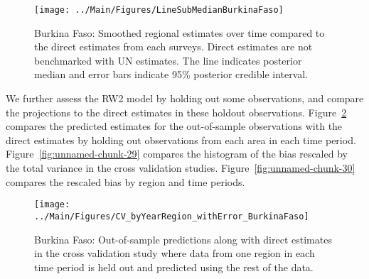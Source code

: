 \documentclass[12pt]{article}\usepackage[]{graphicx}\usepackage[]{color}
\newenvironment{knitrout}{}{} %
\begin{document}
\begin{knitrout}
\color{fgcolor}\begin{figure}[bht]

{\centering \texttt{[image: ../Main/Figures/LineSubMedianBurkinaFaso]} 

}

\caption[Burkina Faso]{Burkina Faso: Smoothed regional estimates over time compared to the direct estimates from each surveys. Direct estimates are not benchmarked with UN estimates. The line indicates posterior median and error bars indicate 95\% posterior credible interval.}\label{fig:unnamed-chunk-27}
\end{figure}


\end{knitrout}
We further assess the RW2 model by holding out some observations, and compare the projections to the direct estimates in these holdout observations. Figure~\ref{fig:unnamed-chunk-28} compares the predicted estimates for the out-of-sample observations  with the direct estimates by holding out observations from each area in each time period.  Figure~\ref{fig:unnamed-chunk-29} compares the histogram of the bias rescaled by the total variance in the cross validation studies. Figure~\ref{fig:unnamed-chunk-30} compares the rescaled bias by region and time periods.



 
\begin{knitrout}
\color{fgcolor}\begin{figure}[bht]

{\centering \texttt{[image: ../Main/Figures/CV\_byYearRegion\_withError\_BurkinaFaso]} 

}

\caption[Burkina Faso]{Burkina Faso: Out-of-sample predictions along with direct estimates in the cross validation study where data from one region in each time period is held out and predicted using the rest of the data.}\label{fig:unnamed-chunk-28}
\end{figure}


\end{knitrout}
\end{document}
